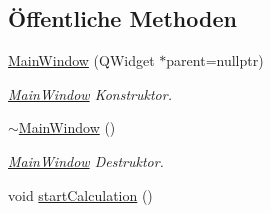 \subsection*{Öffentliche Methoden}
\begin{DoxyCompactItemize}
\item 
\hyperlink{classMainWindow_a996c5a2b6f77944776856f08ec30858d}{Main\+Window} (Q\+Widget $\ast$parent=nullptr)
\begin{DoxyCompactList}\small\item\em \hyperlink{classMainWindow}{Main\+Window} Konstruktor. \end{DoxyCompactList}\item 
\hyperlink{classMainWindow_ae98d00a93bc118200eeef9f9bba1dba7}{$\sim$\+Main\+Window} ()\hypertarget{classMainWindow_ae98d00a93bc118200eeef9f9bba1dba7}{}\label{classMainWindow_ae98d00a93bc118200eeef9f9bba1dba7}

\begin{DoxyCompactList}\small\item\em \hyperlink{classMainWindow}{Main\+Window} Destruktor. \end{DoxyCompactList}\item 
void \hyperlink{classMainWindow_a2928be63df3071466644eca76d6e32a7}{start\+Calculation} ()\hypertarget{classMainWindow_a2928be63df3071466644eca76d6e32a7}{}\label{classMainWindow_a2928be63df3071466644eca76d6e32a7}


\end{DoxyCompactItemize}
